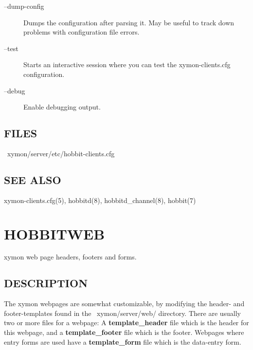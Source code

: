 \begin{description}
 

\item[--dump-config] Dumps the configuration after parsing it. May be useful to track down problems with configuration file errors. 

 

\item[--test] Starts an interactive session where you can test the xymon-clients.cfg configuration. 

 

\item[--debug] Enable debugging output. 

 


\end{description}
\subsection{FILES}
\begin{description}
\item[~xymon/server/etc/hobbit-clients.cfg]

 


\end{description}
\subsection{SEE ALSO}
xymon-clients.cfg(5), hobbitd(8), hobbitd\_channel(8), hobbit(7) 

 
%
%
\newpage
\section{HOBBITWEB}

 xymon web page headers, footers and forms. 

 
\subsection{DESCRIPTION}
 The xymon webpages are somewhat customizable, by modifying the header- and footer-templates found in the ~xymon/server/web/ directory. There are usually two or more files for a webpage: A \textbf{template\_header}
 file which is the header for this webpage, and a \textbf{template\_footer}
 file which is the footer. Webpages where entry forms are used have a \textbf{template\_form}
 file which is the data-entry form. 

